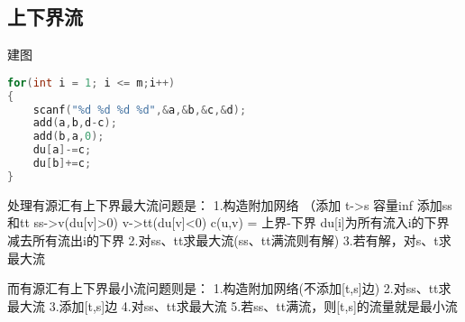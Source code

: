 \subsection{上下界流}
建图
    \begin{lstlisting}[language=c++]
for(int i = 1; i <= m;i++)
{
	scanf("%d %d %d %d",&a,&b,&c,&d);   
    add(a,b,d-c);
    add(b,a,0);
    du[a]-=c;
    du[b]+=c;
}
    \end{lstlisting}
处理有源汇有上下界最大流问题是：
1.构造附加网络   （添加 t->s 容量inf 添加ss和tt  ss->v(du[v]>0) v->tt(du[v]<0)  c(u,v) = 上界-下界  du[i]为所有流入i的下界减去所有流出i的下界
2.对ss、tt求最大流(ss、tt满流则有解)
3.若有解，对s、t求最大流
 
而有源汇有上下界最小流问题则是：
1.构造附加网络(不添加[t,s]边)
2.对ss、tt求最大流
3.添加[t,s]边
4.对ss、tt求最大流
5.若ss、tt满流，则[t,s]的流量就是最小流
